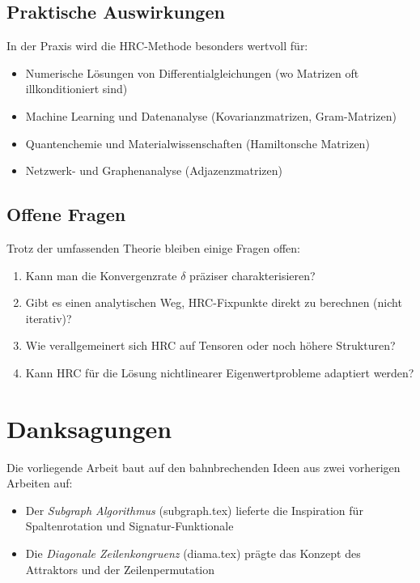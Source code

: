 \documentclass[a4paper,12pt]{article}
\theoremstyle{definition}
\begin{document}
\subsection{Praktische Auswirkungen}

In der Praxis wird die HRC-Methode besonders wertvoll für:

\begin{itemize}
	\item Numerische Lösungen von Differentialgleichungen (wo Matrizen oft illkonditioniert sind)
	\item Machine Learning und Datenanalyse (Kovarianzmatrizen, Gram-Matrizen)
	\item Quantenchemie und Materialwissenschaften (Hamiltonsche Matrizen)
	\item Netzwerk- und Graphenanalyse (Adjazenzmatrizen)
\end{itemize}

\subsection{Offene Fragen}

Trotz der umfassenden Theorie bleiben einige Fragen offen:

\begin{enumerate}
	\item Kann man die Konvergenzrate $\delta$ präziser charakterisieren?
	\item Gibt es einen analytischen Weg, HRC-Fixpunkte direkt zu berechnen (nicht iterativ)?
	\item Wie verallgemeinert sich HRC auf Tensoren oder noch höhere Strukturen?
	\item Kann HRC für die Lösung nichtlinearer Eigenwertprobleme adaptiert werden?
\end{enumerate}

\section{Danksagungen}

Die vorliegende Arbeit baut auf den bahnbrechenden Ideen aus zwei vorherigen Arbeiten auf:

\begin{itemize}
	\item Der \emph{Subgraph Algorithmus} (subgraph.tex) lieferte die Inspiration für Spaltenrotation und Signatur-Funktionale
	\item Die \emph{Diagonale Zeilenkongruenz} (diama.tex) prägte das Konzept des Attraktors und der Zeilenpermutation
\end{itemize}
\end{document}

